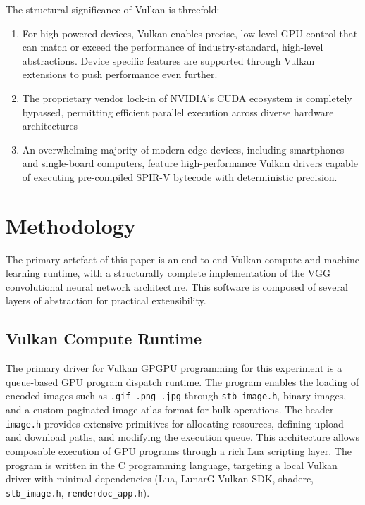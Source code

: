 \documentclass[10pt, a4paper]{article}
\begin{document}
The structural significance of Vulkan is threefold:
\begin{enumerate}
	\item For high-powered devices, Vulkan enables precise, low-level GPU control that can match or exceed the performance of industry-standard, high-level abstractions. Device specific features are supported through Vulkan extensions to push performance even further.
	\item The proprietary vendor lock-in of NVIDIA's CUDA ecosystem is completely bypassed, permitting efficient parallel execution across diverse hardware architectures
	\item An overwhelming majority of modern edge devices, including smartphones and single-board computers, feature high-performance Vulkan drivers capable of executing pre-compiled SPIR-V bytecode with deterministic precision.
\end{enumerate}

\section{Methodology}
The primary artefact of this paper is an end-to-end Vulkan compute and machine learning runtime, with a structurally complete implementation of the VGG convolutional neural network architecture. This software is composed of several layers of abstraction for practical extensibility.

\subsection{Vulkan Compute Runtime}
The primary driver for Vulkan GPGPU programming for this experiment is a queue-based GPU program dispatch runtime. The program enables the loading of encoded images such as \texttt{.gif .png .jpg} through \texttt{stb\_image.h}, binary images, and a custom paginated image atlas format for bulk operations. The header \texttt{image.h} provides extensive primitives for allocating resources, defining upload and download paths, and modifying the execution queue. This architecture allows composable execution of GPU programs through a rich Lua scripting layer. The program is written in the C programming language, targeting a local Vulkan driver with minimal dependencies (Lua, LunarG Vulkan SDK, shaderc, \texttt{stb\_image.h}, \texttt{renderdoc\_app.h}).
\end{document}
